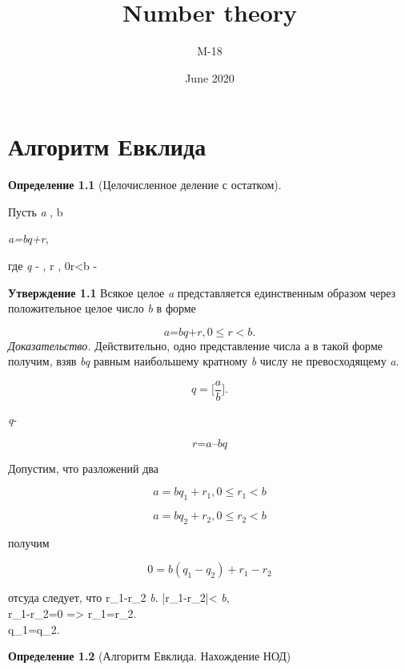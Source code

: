 \documentclass[a4paper]{article}
\title{Number theory}
\author{M-18 }
\date{June 2020}
\begin{document}
\maketitle

\section{Алгоритм Евклида}
\textbf{Определение 1.1}
(Целочисленное деление с остатком).

Пусть \textit{a} \in  {},  b \in  {}  

\begin{center}
  \textit{a=bq+r},
\end{center}

где \textit{q} \in {} - , r \in {}\cup{}\rbrace, 0\le r<b - 

\noindent\textbf{Утверждение 1.1} Всякое целое \textit{a} представляется единственным \mbox{образом} через положительное целое число \textit{b} в форме

\[
\textit{a=bq+r} , 0 \le r<b.
\]
\textit{Доказательство.} Действительно, одно представление числа а в такой форме получим, взяв \textit{bq} равным наибольшему кратному \textit{b} числу не превосходящему \textit{a}.

\[
q = \lbrack\frac{a}{b}\rbrack.
\]

\textit{q}- 

\[
\textit{r=a--bq}
\]

Допустим, что разложений два 

\[
a=bq_{1}+r_{1}, 0 \le r_{1} <b
\]

\[
a=bq_{2}+r_{2}, 0 \le r_{2} <b
\]

получим

\[
0=b(q_{1}-q_{2})+r_{1}-r_{2}
\]

отсуда следует, что r_{1}-r_{2}  \textit{b}. |r_{1}-r_{2}|< \textit{b},\\  r_{1}-r_{2}=0 => r_{1}=r_{2}.\\ q_{1}=q_{2}.\\ 

\noindent\textbf{Определение 1.2}
(Алгоритм Евклида. Нахождение НОД)
\end{document}
